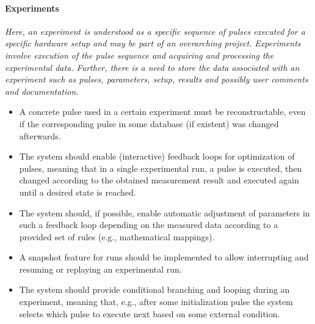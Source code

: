 \documentclass[a4paper,12pt]{article}
\begin{document}
\paragraph{Experiments} 
\textit{Here, an experiment is understood as a specific sequence of pulses executed for a specific hardware setup and may be part of an overarching project. Experiments involve execution of the pulse sequence and acquiring and processing the experimental data. Further, there is a need to store the data associated with an experiment such as pulses, parameters, setup, results and possibly user comments and documentation.}
\begin{itemize} \itemsep-0.5pt
 \item A concrete pulse used in a certain experiment must be reconstructable, even if the corresponding pulse in some database (if existent) was changed afterwards.
 \item The system should enable (interactive) feedback loops for optimization of pulses, meaning that in a single experimental run, a pulse is executed, then changed according to the obtained measurement result and executed again until a desired state is reached.
 \item The system should, if possible, enable automatic adjustment of parameters in such a feedback loop depending on the measured data according to a provided set of rules (e.g., mathematical mappings).
 \item A snapshot feature for runs should be implemented to allow interrupting and resuming or replaying an experimental run.
 \item The system should provide conditional branching and looping during an experiment, meaning that, e.g., after some initialization pulse the system selects which pulse to execute next based on some external condition.
\end{itemize}
\end{document}

